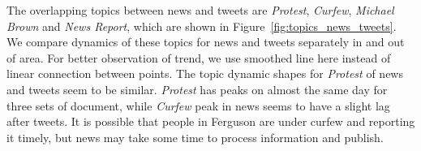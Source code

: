 The overlapping topics between news and tweets are \emph{Protest}, \emph{Curfew}, \emph{Michael Brown} and \emph{News Report}, which are shown in Figure~\ref{fig:topics_news_tweets}. We compare dynamics of these topics for news and tweets separately in and out of \stlouis area. For better observation of trend, we use smoothed line here instead of linear connection between points. The topic dynamic shapes for \emph{Protest} of news and tweets seem to be similar. \emph{Protest} has peaks on almost the same day for three sets of document, while \emph{Curfew} peak in news seems to have a slight lag after tweets. It is possible that people in Ferguson are under curfew and reporting it timely, but news may take some time to process information and publish.

\begin{figure}[htpb]
\centering
{}
\end{figure}
